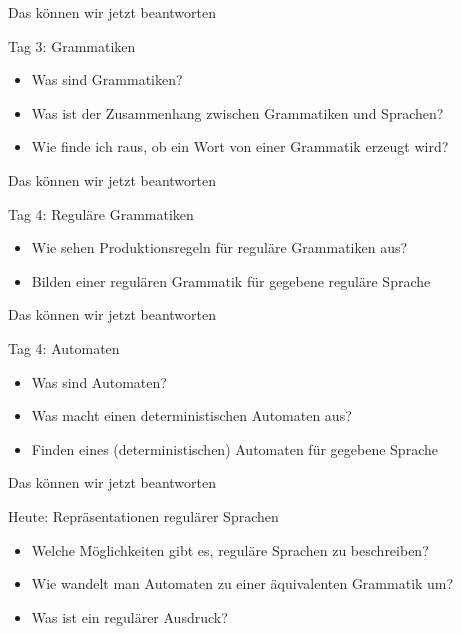 

\begin{frame}[fragile]{Das können wir jetzt beantworten}
    \begin{alertblock}{Tag 3: Grammatiken}
        \begin{itemize}
            \item Was sind Grammatiken?
            \item Was ist der Zusammenhang zwischen Grammatiken und Sprachen?
            \item Wie finde ich raus, ob ein Wort von einer Grammatik erzeugt wird?
        \end{itemize}
    \end{alertblock}
\end{frame}

\begin{frame}[fragile]{Das können wir jetzt beantworten}
    \begin{alertblock}{Tag 4: Reguläre Grammatiken}
        \begin{itemize}
            \item Wie sehen Produktionsregeln für reguläre Grammatiken aus?
            \item Bilden einer regulären Grammatik für gegebene reguläre Sprache
        \end{itemize}
    \end{alertblock}
\end{frame}

\begin{frame}[fragile]{Das können wir jetzt beantworten}
    \begin{alertblock}{Tag 4: Automaten}
        \begin{itemize}
            \item Was sind Automaten?
            \item Was macht einen deterministischen Automaten aus?
            \item Finden eines (deterministischen) Automaten für gegebene Sprache
        \end{itemize}
    \end{alertblock}
\end{frame}



\begin{frame}[fragile]{Das können wir jetzt beantworten}
    \begin{alertblock}{Heute: Repräsentationen regulärer Sprachen}
        \begin{itemize}
            \item Welche Möglichkeiten gibt es, reguläre Sprachen zu beschreiben?
            \item Wie wandelt man Automaten zu einer äquivalenten Grammatik um?
            \item Was ist ein regulärer Ausdruck?
        \end{itemize}
    \end{alertblock}
\end{frame}

